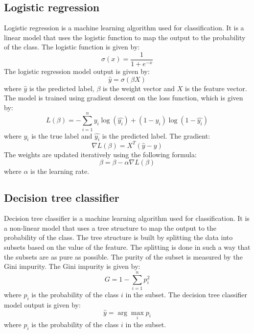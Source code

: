 \documentclass{article}
\begin{document}
\subsection{Logistic regression}
Logistic regression is a machine learning algorithm used for classification. It is a linear model that uses the logistic function to map the output to the probability of the class. The logistic function is given by:
\begin{equation}
    \sigma(x) = \frac{1}{1 + e^{-x}}
\end{equation}
The logistic regression model output is given by:
\begin{equation}
    \hat{y} = \sigma(\beta X)
\end{equation}
where $\hat{y}$ is the predicted label, $\beta$ is the weight vector and $X$ is the feature vector. The model is trained using gradient descent on the loss function, which is given by:
\begin{equation}
    L(\beta) = -\sum_{i=1}^{n} y_i \log(\hat{y_i}) + (1 - y_i) \log(1 - \hat{y_i})
\end{equation}
where $y_i$ is the true label and $\hat{y_i}$ is the predicted label.
The gradient:
\begin{equation}
    \nabla L(\beta) = X^T(\hat{y} - y)
\end{equation}
The weights are updated iteratively using the following formula:
\begin{equation}
    \beta = \beta - \alpha \nabla L(\beta)
\end{equation}
where $\alpha$ is the learning rate.

\subsection{Decision tree classifier}
Decision tree classifier is a machine learning algorithm used for classification. It is a non-linear model that uses a tree structure to map the output to the probability of the class. The tree structure is built by splitting the data into subsets based on the value of the feature. The splitting is done in such a way that the subsets are as pure as possible. The purity of the subset is measured by the Gini impurity. The Gini impurity is given by:
\begin{equation}
    G = 1 - \sum_{i=1}^{n} p_i^2
\end{equation}
where $p_i$ is the probability of the class $i$ in the subset. The decision tree classifier model output is given by:
\begin{equation}
    \hat{y} = \arg\max_{i} p_i
\end{equation}
where $p_i$ is the probability of the class $i$ in the subset.
\end{document}
